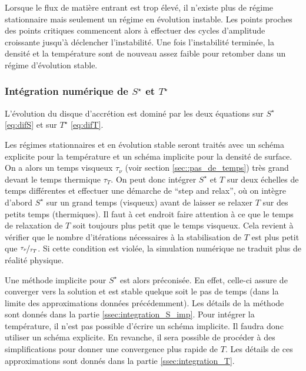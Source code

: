 Lorsque le flux de matière entrant est trop élevé, il n'existe plus de régime
stationnaire mais seulement un régime en évolution instable. Les points proches
des points critiques commencent alors à effectuer des cycles d'amplitude
croissante jusqu'à déclencher l'instabilité. Une fois l'instabilité terminée,
la densité et la température sont de nouveau assez faible pour retomber dans un
régime d'évolution stable.

\subsubsection{Intégration numérique de $S^\star$ et $T^\star$}

L'évolution du disque d'accrétion est dominé par les deux équations sur
$S^\star$ \eqref{eq:difS} et sur $T^\star$ \eqref{eq:difT}.

Les régimes stationnaires et en évolution stable seront traités avec un schéma
explicite pour la température et un schéma implicite pour la densité de
surface. On a alors un temps visqueux $\tau_\nu$  (voir section \ref{sec::pas_de_temps}) très grand devant le temps
thermique $\tau_T$. On peut donc intégrer $S^\star$ et $T$ sur deux échelles de
temps différentes et effectuer une démarche de ``step and relax'', où on
intègre d'abord $S^\star$ sur un grand temps (visqueux) avant de laisser se
relaxer $T$ sur des petits temps (thermiques). Il faut à cet endroit faire
attention à ce que le temps de relaxation de $T$ soit toujours plus petit que
le temps visqueux. Cela revient à vérifier que le nombre d'itérations
nécessaires à la stabilisation de $T$ est plus petit que
$\nicefrac{\tau_\nu}{\tau_T}$. Si cette condition est violée, la simulation
numérique ne traduit plus de réalité physique. 

Une méthode implicite pour $S^\star$ est alors préconisée. En effet, celle-ci
assure de converger vers la solution et est stable quelque soit le pas de temps
(dans la limite des approximations données précédemment). Les détails de la
méthode sont donnés dans la partie \ref{ssec:integration_S_imp}. Pour intégrer
la température, il n'est pas possible d'écrire un schéma implicite. Il faudra
donc utiliser un schéma explicite. En revanche, il sera possible de procéder à
des simplifications pour donner une convergence plus rapide de $T$. Les détails
de ces approximations sont donnés dans la partie \ref{ssec:integration_T}.

